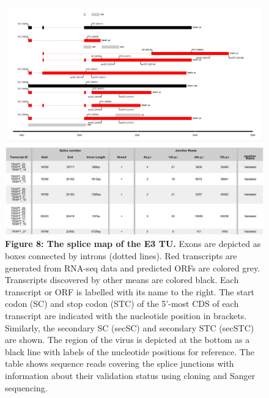 \documentclass[
]{article}
\begin{document}
\begin{figure}
\centering
\includegraphics{results/r/figures/figure_8.png}
\caption{\textbf{Figure 8: The splice map of the E3 TU.} Exons are
depicted as boxes connected by introns (dotted lines). Red transcripts
are generated from RNA-seq data and predicted ORFs are colored grey.
Transcripts discovered by other means are colored black. Each transcript
or ORF is labelled with its name to the right. The start codon (SC) and
stop codon (STC) of the 5'-most CDS of each transcript are indicated
with the nucleotide position in brackets. Similarly, the secondary SC
(secSC) and secondary STC (secSTC) are shown. The region of the virus is
depicted at the bottom as a black line with labels of the nucleotide
positions for reference. The table shows sequence reads covering the
splice junctions with information about their validation status using
cloning and Sanger sequencing.}
\end{figure}
\end{document}

